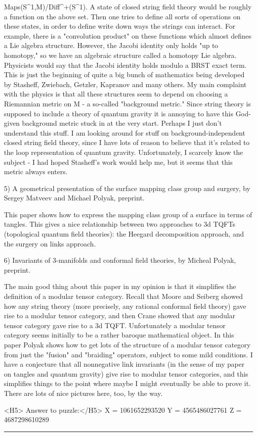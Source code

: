                        Maps(S^{1},M)/Diff^{+}(S^{1}).
A state of closed string field theory would be roughly a function on the
above set.  Then one tries to define all sorts of operations on these
states, in order to define write down ways the strings can interact.
For example, there is a "convolution product" on these functions which
almost defines a Lie algebra structure.  However, the Jacobi identity
only holds "up to homotopy," so we have an algebraic structure called a
homotopy Lie algebra.  Physicists would say that the Jacobi identity
holds modulo a BRST exact term.  This is just the beginning of quite a
big bunch of mathematics being developed by Stasheff, Zwiebach, Getzler,
Kapranov and many others.  My main complaint with the physics is that
all these structures seem to depend on choosing a Riemannian metric on
M - a so-called "background metric."  Since string theory is supposed to
include a theory of quantum gravity it is annoying to have this
God-given background metric stuck in at the very start.  Perhaps I just
don't understand this stuff.  I am looking around for stuff on
background-independent closed string field theory, since I have lots of
reason to believe that it's related to the loop representation of
quantum gravity.  Unfortunately, I scarcely know the subject - I had
hoped Stasheff's work would help me, but it seems that this metric
always enters.

5)  A geometrical presentation of the surface mapping class group and
surgery, by Sergey Matveev and Michael Polyak, preprint.  

This paper shows how to express the mapping class group of a surface in
terms of tangles.  This gives a nice relationship between two approaches
to 3d TQFTs (topological quantum field theories): the Heegard
decomposition approach, and the surgery on links approach.  

6)  Invariants of 3-manifolds and conformal field theories, by Micheal
Polyak, preprint.

The main good thing about this paper in my opinion is that it
simplifies the definition of a modular tensor category.  Recall that
Moore and Seiberg showed how any string theory (more precisely, any
rational conformal field theory) gave rise to a modular tensor category,
and then Crane showed that any modular tensor category gave rise to a 3d
TQFT.  Unfortunately a modular tensor category seems initially to be a
rather baroque mathematical object.  In this paper Polyak shows how to
get lots of the structure of a modular tensor category from just the
"fusion" and "braiding" operators, subject to some mild conditions.  I
have a conjecture that all nonnegative link invariants (in the sense
of my paper on tangles and quantum gravity) give rise to modular tensor
categories, and this simplifies things to the point where maybe I might
eventually be able to prove it.  There are lots of nice pictures here,
too, by the way.


<H5> Answer to puzzle:</H5>
X = 1061652293520
Y = 4565486027761
Z = 4687298610289


\par\noindent\rule{\textwidth}{0.4pt}
